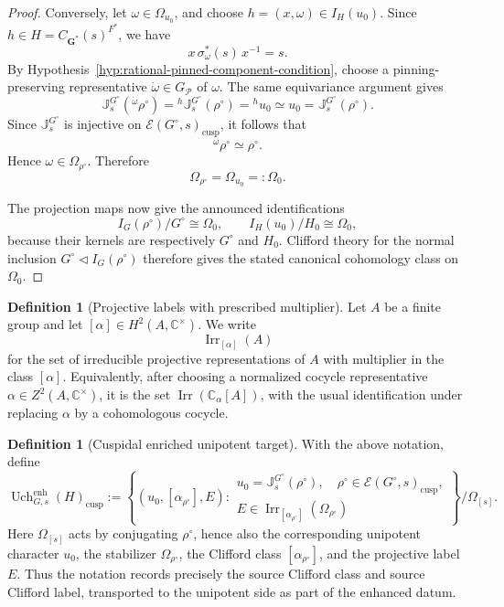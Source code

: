 \documentclass{amsart}
\theoremstyle{plain}
\numberwithin{equation}{section}
\theoremstyle{definition}
\newtheorem{definition}[theorem]{Definition}
\newcommand{\cP}{\mathcal{P}}
\newcommand{\cE}{\mathcal{E}}
\newcommand{\Irr}{\operatorname{Irr}}
\newcommand{\Uch}{\operatorname{Uch}}
\newcommand{\J}{\mathbb{J}}
\newcommand{\cusp}{\operatorname{cusp}}
\newcommand{\bG}{\mathbf{G}}
\newcommand{\C}{\mathbb{C}}
\begin{document}
\begin{proof}
Conversely, let \(\omega\in\Omega_{u_0}\), and choose
\(h=(x,\omega)\in I_H(u_0)\).  Since \(h\in H=C_{\bG^*}(s)^{F^*}\), we have
\[
x\,\sigma_\omega^*(s)\,x^{-1}=s.
\]
By Hypothesis~\ref{hyp:rational-pinned-component-condition}, choose a
pinning-preserving representative \(\dot\omega\in G_{\cP}\) of \(\omega\).
The same equivariance argument gives
\[
\J_s^{G^\circ}({}^{\dot\omega}\rho^\circ)
=
{}^{h}\J_s^{G^\circ}(\rho^\circ)
=
{}^h u_0
\simeq
u_0
=
\J_s^{G^\circ}(\rho^\circ).
\]
Since \(\J_s^{G^\circ}\) is injective on \(\cE(G^\circ,s)_{\cusp}\), it follows
that
\[
{}^{\dot\omega}\rho^\circ\simeq\rho^\circ.
\]
Hence \(\omega\in\Omega_{\rho^\circ}\).  Therefore
\[
\Omega_{\rho^\circ}=\Omega_{u_0}=:\Omega_0.
\]

The projection maps now give the announced identifications
\[
I_G(\rho^\circ)/G^\circ\cong\Omega_0,
\qquad
I_H(u_0)/H_0\cong\Omega_0,
\]
because their kernels are respectively \(G^\circ\) and \(H_0\).  Clifford
theory for the normal inclusion \(G^\circ\lhd I_G(\rho^\circ)\) therefore gives
the stated canonical cohomology class on \(\Omega_0\).
\end{proof}

\begin{definition}[Projective labels with prescribed multiplier]
\label{def:projective-labels-fixed-multiplier}
Let \(A\) be a finite group and let \([\alpha]\in H^2(A,\C^\times)\).  We write
\[
        \Irr_{[\alpha]}(A)
\]
for the set of irreducible projective representations of \(A\) with multiplier
in the class \([\alpha]\).  Equivalently, after choosing a normalized cocycle
representative \(\alpha\in Z^2(A,\C^\times)\), it is the set
\(\Irr(\C_\alpha[A])\), with the usual identification under replacing
\(\alpha\) by a cohomologous cocycle.
\end{definition}

\begin{definition}[Cuspidal enriched unipotent target]
\label{def:enh-cusp-target}
With the above notation, define
\[
\Uch^{\mathrm{enh}}_{G,s}(H)_{\cusp}
:=
\left\{
(u_0,[\alpha_{\rho^\circ}],E)
:
\begin{array}{l}
u_0=\J_s^{G^\circ}(\rho^\circ),\quad
\rho^\circ\in\cE(G^\circ,s)_{\cusp},\\[2mm]
E\in \Irr_{[\alpha_{\rho^\circ}]}(\Omega_{\rho^\circ})
\end{array}
\right\}/\Omega_{[s]}.
\]
Here \(\Omega_{[s]}\) acts by conjugating \(\rho^\circ\), hence also the
corresponding unipotent character \(u_0\), the stabilizer
\(\Omega_{\rho^\circ}\), the Clifford class \([\alpha_{\rho^\circ}]\), and the
projective label \(E\).  Thus the notation records precisely the source
Clifford class and source Clifford label, transported to the unipotent side as
part of the enhanced datum.
\end{definition}
\end{document}
